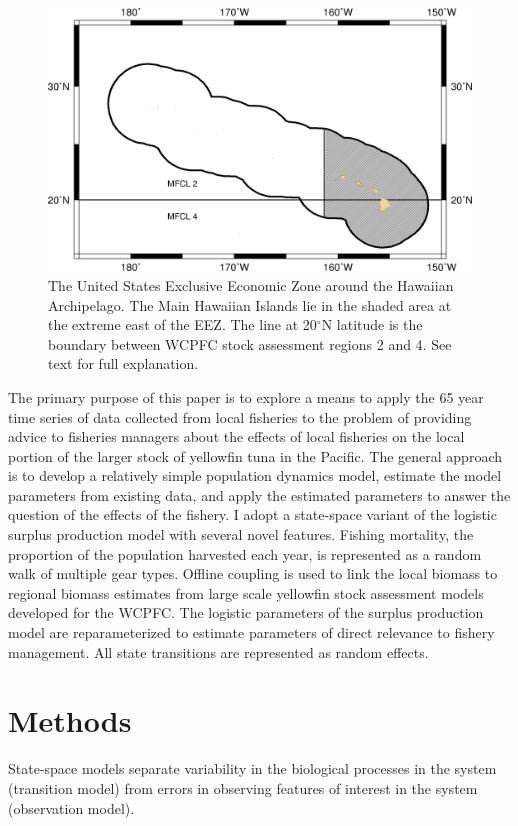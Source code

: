 \documentclass[12pt,letterpaper]{article}
\renewcommand\deg[1]{$^\circ$#1}
\begin{document}
\begin{figure}
\begin{center}
\includegraphics[width=\textwidth]{./HI_regions.png}
\caption{\label{fig:mhimap}
The United States Exclusive Economic Zone around the Hawaiian
Archipelago. The Main Hawaiian Islands lie in the shaded area at the
extreme east of the EEZ. The line at 20\deg{N} latitude is the
boundary between WCPFC stock assessment regions 2 and 4. See text for
full explanation.
}
\end{center}
\end{figure}

The primary purpose of this paper is to explore a means to apply the 65
year time series of
data collected from local fisheries to the problem of
providing advice to fisheries
managers about the effects of local fisheries on the local portion of
the larger stock of yellowfin tuna in the Pacific.
The general approach is to develop a relatively simple population
dynamics model, estimate the model parameters from existing
data, and apply the estimated parameters to answer the question of the
effects of the fishery.
I adopt a state-space variant of
the logistic surplus production model with several novel features.
Fishing mortality, the proportion of the population harvested each
year, is represented as a random walk of multiple gear types.
Offline coupling is used to link the local biomass to regional
biomass estimates from large scale yellowfin stock assessment models
developed for the WCPFC.
The logistic parameters of the surplus production model are
reparameterized to estimate parameters of direct relevance to fishery
management. All state transitions are represented as random effects.

\section*{Methods}
\label{sec:models}
State-space models separate variability in the biological
processes in the system (transition model)
from errors in observing features of interest
in the system (observation model).
\end{document}
